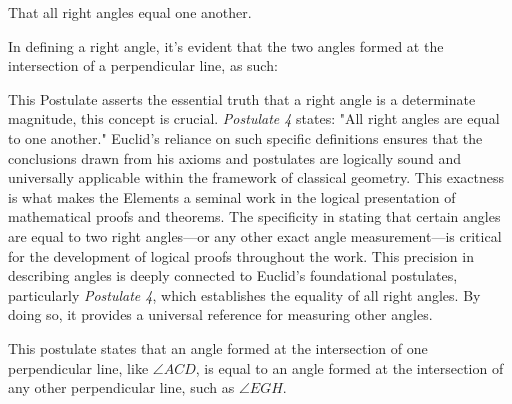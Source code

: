 
\begin{post}
That all right angles equal one another.
\end{post}

In defining a right angle, it's evident that the two angles formed at the intersection of a perpendicular line,  as such: 

\begin{figure}[h]
\centering
\end{figure}

This Postulate asserts the essential truth that a right angle is a determinate magnitude, this concept is crucial. \textit{Postulate 4} states: "All right angles are equal to one another." Euclid's reliance on such specific definitions ensures that the conclusions drawn from his axioms and postulates are logically sound and universally applicable within the framework of classical geometry. This exactness is what makes the Elements a seminal work in the logical presentation of mathematical proofs and theorems. The specificity in stating that certain angles are equal to two right angles—or any other exact angle measurement—is critical for the development of logical proofs throughout the work. This precision in describing angles is deeply connected to Euclid's foundational postulates, particularly \textit{Postulate 4}, which establishes the equality of all right angles. By doing so, it provides a universal reference for measuring other angles.

\clearpage

This postulate states that an angle formed at the intersection of one perpendicular line, like $\angle{ACD}$, is equal to an angle formed at the intersection of any other perpendicular line, such as $\angle{EGH}$.



